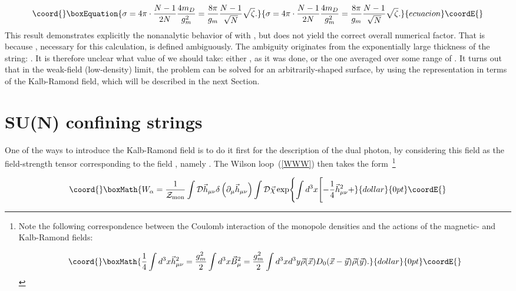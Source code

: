 \documentclass[a4paper,12pt]{article}
\begin{document}
\begin{equation}\coord{}\boxEquation{
\label{Sig}
\sigma=4\pi\cdot\frac{N-1}{2N}\frac{4m_D}{g_m^2}=
\frac{8\pi}{g_m}\frac{N-1}{\sqrt{N}}\sqrt{\zeta}.
}{
\sigma=4\pi\cdot\frac{N-1}{2N}\frac{4m_D}{g_m^2}=
\frac{8\pi}{g_m}\frac{N-1}{\sqrt{N}}\sqrt{\zeta}.
}{ecuacion}\coordE{}\end{equation}
This result demonstrates explicitly the nonanalytic behavior of \myHighlight{$\sigma$}\coordHE{} with \coordHE{}, but
does not yield the correct overall numerical factor. That is because \coordHE{}, necessary for this calculation, is defined ambiguously.
The ambiguity originates from the exponentially
large thickness of the string: \coordHE{}. It is therefore unclear what value of \coordHE{}
we should take: either \coordHE{}, as it was done, or the one averaged over some range of \coordHE{}. It turns out that in the weak-field (low-density) limit,
the problem can be solved for an arbitrarily-shaped surface, by using the representation in terms of the Kalb-Ramond field, which will
be described in the next Section.






\section{SU(N) confining strings}


One of the ways to introduce
the Kalb-Ramond field is to do it first for the description
of the dual photon, by considering this field as the field-strength
tensor corresponding to the field \coordHE{}, namely \coordHE{}.
The Wilson loop~(\ref{WWW}) then takes the form~\footnote{Note the following correspondence between the
Coulomb interaction of the monopole densities and the actions of the magnetic- and Kalb-Ramond fields:

$$\coord{}\boxMath{
\frac14\int d^3x\vec h_{\mu\nu}^2=\frac{g_m^2}{2}\int d^3x\vec B_\mu^2=
\frac{g_m^2}{2}\int d^3x d^3y\vec\rho(\vec x)D_0(\vec x-\vec y)
\vec\rho(\vec y).}{dollar}{0pt}\coordE{}$$}

$$\coord{}\boxMath{
W_\alpha=
\frac{1}{{\cal Z}_{\rm mon}}
\int{\cal D}\vec h_{\mu\nu}\delta\left(\partial_\mu\vec h_{\mu\nu}\right)\int {\cal D}\vec\chi
\exp\Biggl\{\int d^3x\Biggl[-\frac14\vec h_{\mu\nu}^2+}{dollar}{0pt}\coordE{}$$
\end{document}
